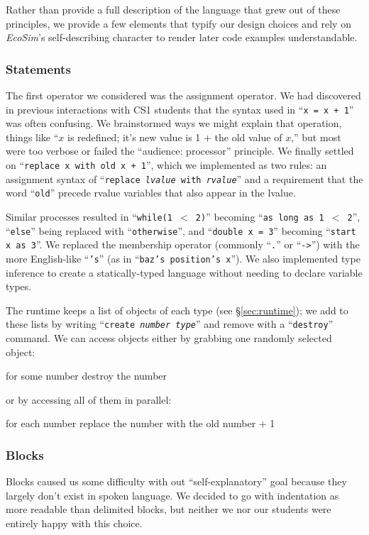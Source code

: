 \documentclass{sig-alternate}
\newcommand{\INDSTATE}[1][1]{\STATE\hspace{#1\algorithmicindent}}
\newcommand{\EcoSim}{\emph{EcoSim}}
\newenvironment{snippet}{\begin{algorithmic}\ttfamily\lsstyle}{\end{algorithmic}}
\newcommand{\code}[1]{``\texttt{\lsstyle#1}''}
\newcommand{\clike}[1]{``\texttt{\lsstyle#1}''}
\begin{document}
Rather than provide a full description of the language that grew out of these principles,
we provide a few elements that typify our design choices
and rely on {\EcoSim}'s self-describing character 
to render later code examples understandable.

\subsubsection{Statements}
The first operator we considered was the assignment operator.
We had discovered in previous interactions with CS1 students
that the syntax used in \clike{x = x + 1} was often confusing.
We brainstormed ways we might explain that operation,
things like ``$x$ is redefined; it's new value is 1 + the old value of $x$,''
but most were too verbose or failed the ``audience: processor'' principle.
We finally settled on \code{replace x with old x + 1},
which we implemented as two rules:
an assignment syntax of \code{replace {\it lvalue} with {\it rvalue}}
and a requirement that the word \code{old} precede rvalue variables that also appear in the lvalue.

Similar processes resulted in 
\code{while(1 $<$ 2)} becoming \code{as long as 1 $<$ 2},
\clike{else} being replaced with \code{otherwise}, 
and \clike{double x = 3} becoming \code{start x as 3}.
We replaced the membership operator (commonly \clike{.} or \mbox{\clike{->}})
with the more English-like \code{'s} (as in \code{baz's position's x}).
We also implemented type inference to create a statically-typed language 
without needing to declare variable types.

The runtime keeps a list of objects of each type (see \S\ref{sec:runtime});
we add to these lists by writing \code{create {\it number} {\it type}} and remove with a \code{destroy} command.
We can access objects either by grabbing one randomly selected object:
\begin{snippet}
\STATE for some number
\INDSTATE destroy the number
\end{snippet}
or by accessing all of them in parallel:
\begin{snippet}
\STATE for each number
\INDSTATE replace the number with the old number + 1
\end{snippet}

\subsubsection{Blocks}
Blocks caused us some difficulty with out ``self-explanatory'' goal because they largely don't exist in spoken language.
We decided to go with indentation as more readable than delimited blocks, but neither we nor our students were entirely happy with this choice.
\end{document}
